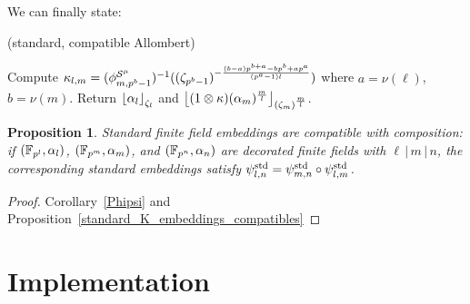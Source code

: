 \documentclass{sig-alternate}
\newtheorem{proposition}[theorem]{Proposition}
\begin{document}
We can finally state:
\begin{algorithm}
  \caption{(standard, compatible Allombert)}
  \label{algo:std_embed}
  \begin{algorithmic}[1]
  \STATE Compute $\kappa_{l,m}=({\phi^{\mathcal{S}^\mu}_{{m},{p^b-1}}})^{-1}((\zeta_{p^b-1})^{-\frac{(b-a)p^{b+a}-bp^b+ap^a}{(p^a-1)l}})$ where $a=\nu(\ell)$, $b=\nu(m)$.
  \STATE Return $\left\lfloor \alpha_l \right\rfloor_{\zeta_l}$ and $\left\lfloor (1\otimes\kappa)(\alpha_m)^{\frac{m}{l}} \right\rfloor_{(\zeta_m)^{\frac{m}{l}}}$.
  \end{algorithmic}
\end{algorithm}
\begin{proposition}
\label{standard_ff_embeddings_compatibles}
Standard finite field embeddings are compatible with composition:
if $(\mathbb{F}_{p^l},\alpha_l)$, $(\mathbb{F}_{p^m},\alpha_m)$, and $(\mathbb{F}_{p^n},\alpha_n)$ are decorated finite fields
with $\ell\,|\,m\,|\,n$, the corresponding standard embeddings
satisfy ${\psi^{\textrm{std}}_{{l},{n}}}={\psi^{\textrm{std}}_{{m},{n}}}\circ{\psi^{\textrm{std}}_{{l},{m}}}$.
\end{proposition}
\begin{proof}
Corollary~\ref{Phipsi} and Proposition~\ref{standard_K_embeddings_compatibles}
\end{proof}



\section{Implementation}
\label{sec:implementation}



\end{document}

